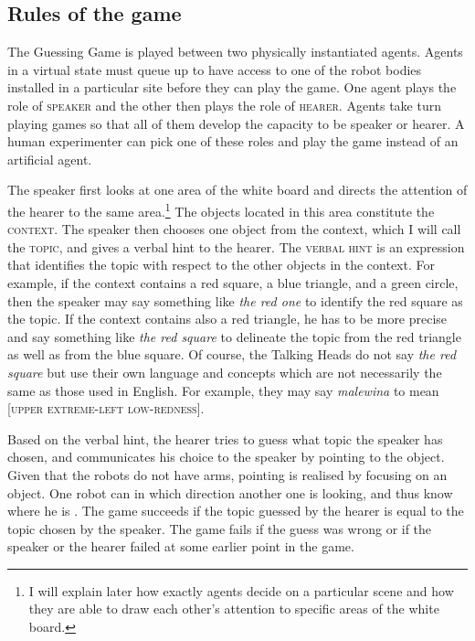 \subsection{Rules of the game}

The Guessing Game is played between two 
physically instantiated agents. Agents in 
a virtual state must queue up to have access to one of the 
robot bodies installed in a particular site before
they can play the game. One agent 
plays the role of {\scshape speaker} and the other then plays the 
role of {\scshape hearer}. Agents take turn playing games 
so that all of them develop the capacity to be speaker or hearer.
A human experimenter can pick one of these roles and 
play the game instead of an artificial agent. 

The speaker first looks at one area of the white board and 
directs the attention of the hearer to the same area.\footnote{I will explain later how exactly agents
decide on a particular scene and how they are able to 
draw each other's attention to specific areas of the 
white board.}
The objects located in this area constitute the {\scshape context}. 
The speaker then chooses one object from the context, which 
I will call the {\scshape topic}, and gives a verbal hint
to the hearer. The {\scshape verbal hint} is an expression
that identifies the topic 
with respect to the other objects in the context. For example, 
if the context contains a red square, a blue triangle, 
and a green circle, then the speaker may say something like 
\textit{the red one} to identify the red square as the topic. 
If the context contains also a red triangle, he has to be more 
precise and say something like \textit{the red square} to delineate
the topic from the red triangle as well as
from the blue square. 
Of course, the Talking Heads do not say \textit{the red square}
but use their own language and concepts which are not 
necessarily the same as those used in English. For example, 
they may say \textit{malewina} to mean [\textsc{upper extreme}-\textsc{left low}-\textsc{redness}]. 

Based on the verbal hint, the hearer tries to guess what
topic the speaker has chosen, and communicates his choice 
to the speaker by pointing to the object. Given that 
the robots do not have arms, pointing is realised by 
focusing on an object. One robot can  in which direction another one 
is looking, and thus know where he is . 
The game succeeds if the topic guessed by the hearer is 
equal to the topic chosen by the speaker. 
The game fails if the guess was wrong or 
if the speaker or the hearer failed at some earlier point in the 
game. 

